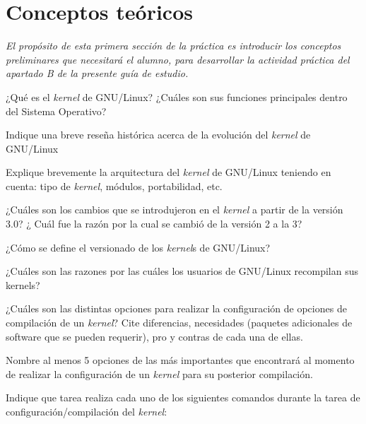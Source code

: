 \section{Conceptos teóricos}
\textit{El propósito de esta primera sección de la práctica es introducir
  los conceptos preliminares que necesitará el alumno, para desarrollar la
  actividad práctica del apartado B de la presente guía de estudio.}
\begin{questions}
  \question ¿Qué es el \textit{kernel} de GNU/Linux? ¿Cuáles son sus funciones
  principales dentro del Sistema Operativo?

  \question Indique una breve reseña histórica acerca de la evolución del
  \textit{kernel} de GNU/Linux

  \question Explique brevemente la arquitectura del \textit{kernel} de GNU/Linux
  teniendo en cuenta: tipo de \textit{kernel}, módulos, portabilidad, etc.

  \question ¿Cuáles son los cambios que se introdujeron en el \textit{kernel} a
  partir de la versión 3.0? ¿ Cuál fue la razón por la cual se cambió de la
  versión 2 a la 3?

  \question ¿Cómo se define el versionado de los \textit{kernel}s de GNU/Linux?

  \question ¿Cuáles son las razones por las cuáles los usuarios de
  GNU/Linux recompilan sus kernels?

  \question ¿Cuáles son las distintas opciones para realizar la
  configuración de opciones de compilación de un \textit{kernel}? Cite diferencias,
  necesidades (paquetes adicionales de software que se pueden requerir),
  pro y contras de cada una de ellas.

  \question Nombre al menos 5 opciones de las más importantes que
  encontrará al momento de realizar la configuración de un \textit{kernel} para su
  posterior compilación.

  \question Indique que tarea realiza cada uno de los siguientes comandos
  durante la tarea de configuración/compilación del \textit{kernel}:

\end{questions}
